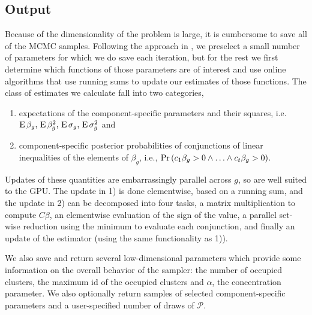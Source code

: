 {%


\subsection{Output}
\label{subsec:output}
Because of the dimensionality of the problem is large, it is cumbersome to save all of the MCMC samples. Following the approach in \citet{landau}, we preselect a small number of parameters for which we do save each iteration, but for the rest we first determine which functions of those parameters are of interest and use online algorithms that use running sums to update our estimates of those functions. The class of estimates we calculate fall into two categories,
\begin{enumerate}
\item expectations of the component-specific parameters and their squares, i.e. $\operatorname{E} \beta_g,\, \operatorname{E} \beta_g^2,\, \operatorname{E}\sigma_g,\, \operatorname{E}\sigma_g^2$ and 
\item component-specific posterior probabilities of conjunctions of linear
  inequalities of the elements of $\beta_g$, i.e.,
  $\operatorname{Pr}\left(c_1\beta_g > 0 \land \ldots \land c_t\beta_g > 0\right)$.
\end{enumerate}
Updates of these quantities are embarrassingly parallel across $g$, so are well suited to the GPU. The update in 1) is done elementwise, based on a running sum, and the update in 2) can be decomposed into four tasks, a matrix multiplication to compute $C\beta$, an elementwise evaluation of the sign of the value, a parallel set-wise reduction using the minimum to evaluate each conjunction, and finally an update of the estimator (using the same functionality as 1)).

We also save and return several low-dimensional parameters which provide some information on the overall behavior of the sampler: the number of occupied clusters, the maximum id of the occupied clusters and $\alpha$, the concentration parameter. We also optionally return samples of selected component-specific parameters and a user-specified number of draws of $\mathcal{P}$.


}
